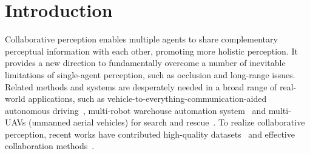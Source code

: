 \vspace{-3mm}
\section{Introduction}\label{intro}
\vspace{-2mm}



Collaborative perception enables multiple agents to share complementary perceptual information with each other, promoting more holistic perception. It provides a new direction to fundamentally overcome a number of inevitable limitations of single-agent perception, such as occlusion and long-range issues. Related methods and systems are desperately needed in a broad range of real-world applications, such as vehicle-to-everything-communication-aided autonomous driving~\cite{v2vnet,disconet,Chen20213DPC},  multi-robot warehouse automation system~\cite{li2020mechanism,zaccaria2021multi} and multi-UAVs (unmanned aerial vehicles) for search and rescue~\cite{scherer2015autonomous,alotaibi2019lsar,DVDET}. To realize collaborative perception, recent works have contributed high-quality datasets~\cite{V2XSim,OPV2V,dair} and effective collaboration methods~\cite{when2com,who2com,disconet,zhou2022multi,ArnoldDT:22,SyncNet,Li2022mrsc, CoBEVT,UQ4CP}.
\vspace{-1mm}

